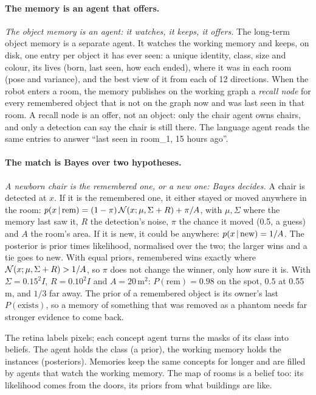 \documentclass[11pt]{article}
\newcommand{\slt}[1]{\emph{#1}}   %
\begin{document}
\paragraph{The memory is an agent that offers.} \slt{The object memory is an agent: it watches, it keeps, it offers.} The long-term object memory is a separate agent. It watches the working memory and keeps, on disk, one entry per object it has ever seen: a unique identity, class, size and colour, its lives (born, last seen, how each ended), where it was in each room (pose and variance), and the best view of it from each of 12 directions. When the robot enters a room, the memory publishes on the working graph a \emph{recall node} for every remembered object that is not on the graph now and was last seen in that room. A recall node is an offer, not an object: only the chair agent owns chairs, and only a detection can say the chair is still there. The language agent reads the same entries to answer ``last seen in room\_1, 15 hours ago''.

\paragraph{The match is Bayes over two hypotheses.} \slt{A newborn chair is the remembered one, or a new one: Bayes decides.} A chair is detected at $x$. If it is the remembered one, it either stayed or moved anywhere in the room: $p(x\,|\,\text{rem})=(1-\pi)\,\mathcal{N}(x;\mu,\Sigma+R)+\pi/A$, with $\mu,\Sigma$ where the memory last saw it, $R$ the detection's noise, $\pi$ the chance it moved (0.5, a guess) and $A$ the room's area. If it is new, it could be anywhere: $p(x\,|\,\text{new})=1/A$. The posterior is prior times likelihood, normalised over the two; the larger wins and a tie goes to new. With equal priors, remembered wins exactly where $\mathcal{N}(x;\mu,\Sigma+R)>1/A$, so $\pi$ does not change the winner, only how sure it is. With $\Sigma=0.15^2I$, $R=0.10^2I$ and $A=20$\,m$^2$: $P(\text{rem})=0.98$ on the spot, $0.5$ at 0.55\,m, and $1/3$ far away. The prior of a remembered object is its owner's last $P(\text{exists})$, so a memory of something that was removed as a phantom needs far stronger evidence to come back.

\begin{keyidea}
The retina labels pixels; each concept agent turns the masks of its class into beliefs. The agent holds the class (a prior), the working memory holds the instances (posteriors). Memories keep the same concepts for longer and are filled by agents that watch the working memory. The map of rooms is a belief too: its likelihood comes from the doors, its priors from what buildings are like.
\end{keyidea}
\end{document}
